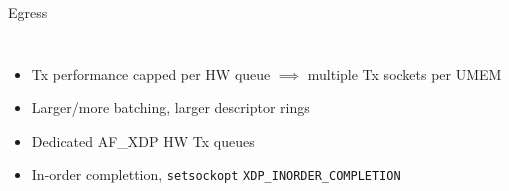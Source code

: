 \documentclass[aspectratio=169]{beamer}
\begin{document}
  \begin{frame}{Egress}
  \begin{columns}[T,onlytextwidth]
    \begin{itemize}
    \item Tx performance capped per HW queue $\implies$ multiple Tx
      sockets per UMEM
    \item Larger/more batching, larger descriptor rings
    \item Dedicated AF\_XDP HW Tx queues
    \item In-order complettion, {\tt setsockopt} {\tt XDP\_INORDER\_COMPLETION}
    \end{itemize}
    \centering{}
    \end{columns}
  \end{frame}
\end{document}
